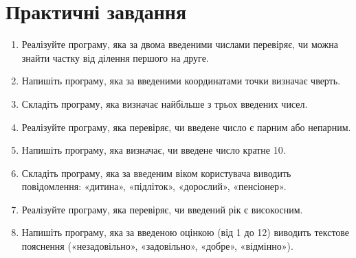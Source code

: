 \section*{Практичні завдання}
\begin{enumerate}
	\item Реалізуйте програму, яка за двома введеними числами перевіряє, чи можна знайти частку від ділення першого на друге.
	\item Напишіть програму, яка за введеними координатами точки визначає чверть.
	\item Складіть програму, яка визначає найбільше з трьох введених чисел.
	\item Реалізуйте програму, яка перевіряє, чи введене число є парним або непарним.
	\item Напишіть програму, яка визначає, чи введене число кратне 10.
	\item Складіть програму, яка за введеним віком користувача виводить повідомлення: «дитина», «підліток», «дорослий», «пенсіонер».
	\item Реалізуйте програму, яка перевіряє, чи введений рік є високосним.
	\item Напишіть програму, яка за введеною оцінкою (від 1 до 12) виводить текстове пояснення («незадовільно», «задовільно», «добре», «відмінно»).
\end{enumerate}
